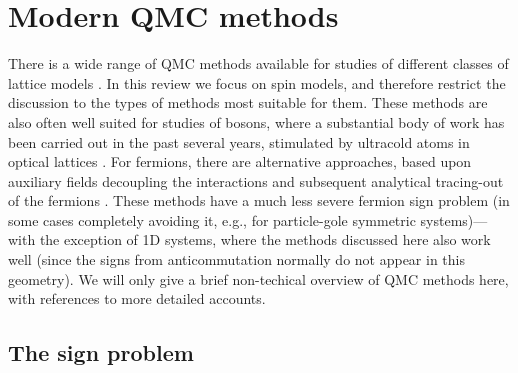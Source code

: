 \documentclass[10pt,pre,aps,twocolumn,showpacs,subscriptaddresses,floatfix]{revtex4}
\begin{document}
\section{Modern QMC methods}
\label{sec:methods}

There is a wide range of QMC methods available for studies of different classes of lattice models \cite{Assaad07,Evertz03,Sandvik10b}. In this review we 
focus on spin models, and therefore restrict the discussion to the types of methods most suitable for them. These methods are also often well suited for studies 
of bosons, where a substantial body of work has been carried out in the past several years, stimulated by ultracold atoms in optical 
lattices \cite{Kashurnikov02,Wessel04,Kato08,Pollet10}. For fermions, there are alternative approaches, based upon auxiliary fields decoupling the interactions and 
subsequent analytical tracing-out of the fermions \cite{Hirsch82,Assaad07}. These methods have a much less severe fermion sign problem (in some cases completely 
avoiding it, e.g., for particle-gole symmetric systems)---with the exception of 1D systems, where the methods discussed here also work well (since the signs 
from anticommutation normally do not appear in this geometry). We will only give a brief non-techical overview of QMC methods here, with references to 
more detailed accounts.

\subsection{The sign problem}
\label{ss:sign}
\end{document}
